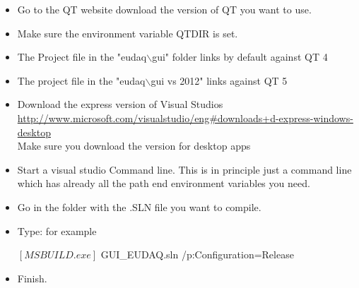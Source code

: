 \begin{itemize}
      \item Go to the QT website download the version of QT you want to use.
      \item Make sure the environment variable QTDIR is set. 
      \item The Project file in the "eudaq\ensuremath{\backslash}gui" folder links by default against QT 4
      \item The project file in the "eudaq\ensuremath{\backslash}gui vs 2012" links against QT 5
      \item Download the express version of Visual Studios\\
      \url{http://www.microsoft.com/visualstudio/eng#downloads+d-express-windows-desktop}\\
      Make sure you download the version for desktop apps 
      \item Start a visual studio Command line. This is in principle just a command line which has already all the path end environment variables you need.
      \item Go in the folder with the .SLN file you want to compile. 
      \item Type: for example\\
      \begin{listing}[mybash]
$[MSBUILD.exe]$ GUI_EUDAQ.sln /p:Configuration=Release
\end{listing}
 
\item Finish.
    
\end{itemize}
